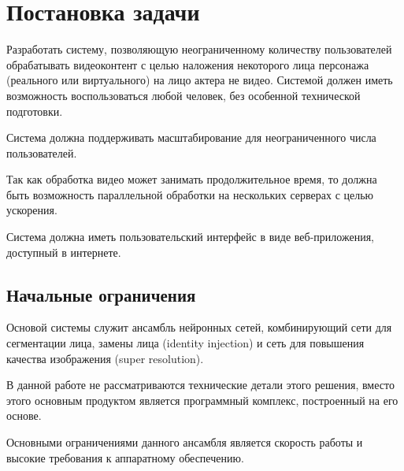 \section{Постановка задачи}

Разработать систему, позволяющую неограниченному количеству пользователей обрабатывать видеоконтент с целью наложения некоторого лица персонажа (реального или виртуального) на лицо актера не видео. Системой должен иметь возможность воспользоваться любой человек, без особенной технической подготовки.

Система должна поддерживать масштабирование для неограниченного числа пользователей.

Так как обработка видео может занимать продолжительное время, то должна быть возможность параллельной обработки на нескольких серверах с целью ускорения.

Система должна иметь пользовательский интерфейс в виде веб-приложения, доступный в интернете.


\subsection{Начальные ограничения}

Основой системы служит ансамбль нейронных сетей, комбинирующий сети для сегментации лица, замены лица (identity injection) и сеть для повышения качества изображения (super resolution).

В данной работе не рассматриваются технические детали этого решения, вместо этого основным продуктом является программный комплекс, построенный на его основе.

Основными ограничениями данного ансамбля является скорость работы и высокие требования к аппаратному обеспечению.